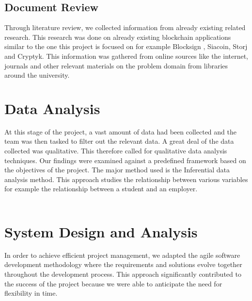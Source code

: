 \subsection{Document Review}
Through literature review, we collected information from already existing related research. This research was done on already existing blockchain applications similar to the one this project is focused on for example Blocksign \cite{art14}, Siacoin\cite{art15}, Storj\cite{art16} and Cryptyk\cite{art9}. This information was gathered from online sources like the internet, journals and other relevant materials on the problem domain from libraries around the university.


\section{Data Analysis}
At this stage of the project, a vast amount of data had been collected and the team was then tasked to filter out the relevant data. A great deal of the data collected was qualitative. This therefore called for qualitative data analysis techniques. Our findings were examined against a predefined framework based on the objectives of the project. The major method used is the Inferential data analysis method. This approach studies the relationship between various variables for example the relationship between a student and an employer.\\~\\


\section{System Design and Analysis}
In order to achieve efficient project management, we adapted the agile software development methodology where the requirements and solutions evolve together throughout the development process. This approach significantly contributed to the success of the project because we were able to anticipate the need for flexibility in time. 

